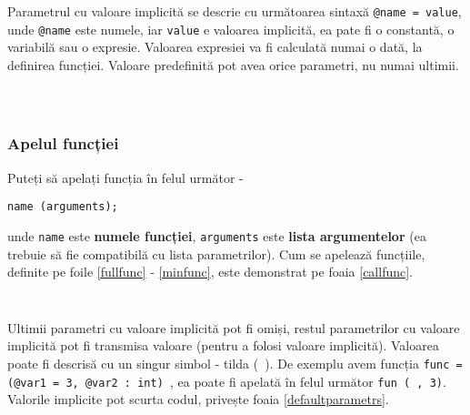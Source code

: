 Parametrul cu valoare implicită se descrie cu următoarea sintaxă \texttt{@name = value}, unde \texttt{@name} este numele, iar \texttt{value} e valoarea implicită, ea pate fi o constantă, o variabilă sau o expresie. Valoarea expresiei va fi calculată numai o dată, la definirea funcției. Valoare predefinită pot avea orice parametri, nu numai ultimii.

\begin{sourcecode}
	\label{fullfunc}
	\inputminted[linenos]{icl}{../sources/fullfunc.icL}
\end{sourcecode}

\begin{listing}
	\label{noargsfunc}
	\inputminted[linenos]{icl}{../sources/noargsfunc.icL}
\end{listing}

\begin{listing}
	\label{notypefunc}
	\inputminted[linenos]{icl}{../sources/notypefunc.icL}
\end{listing}

\subsubsection{Apelul funcției}

Puteți să apelați funcția în felul următor -
\begin{verbatim}
name (arguments);
\end{verbatim}
unde \texttt{name} este {\bf numele funcției}, \texttt{arguments} este {\bf lista argumentelor} (ea trebuie să fie compatibilă cu lista parametrilor). Cum se apelează funcțiile, definite pe foile \ref{fullfunc} - \ref{minfunc}, este demonstrat pe foaia \ref{callfunc}.

\begin{sourcecode}
	\label{minfunc}
	\inputminted[linenos]{icl}{../sources/minfunc.icL}
\end{sourcecode}

\begin{sourcecode}
	\label{callfunc}
	\inputminted[linenos]{icl}{../sources/callfunc.icL}
\end{sourcecode}

Ultimii parametri cu valoare implicită pot fi omiși, restul parametrilor cu valoare implicită pot fi transmisa valoare \void{} (pentru a folosi valoare implicită). Valoarea \void{} poate fi descrisă cu un singur simbol - tilda (\texttt{~}). De exemplu avem funcția \texttt{func = (@var1 = 3, @var2 : int) {}}, ea poate fi apelată în felul următor \texttt{fun (~, 3)}. Valorile implicite pot scurta codul, privește foaia \ref{defaultparametrs}.


